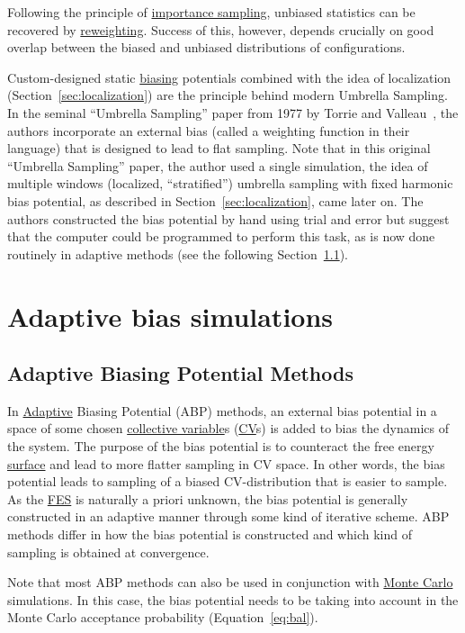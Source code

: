 \documentclass[9pt,review]{livecoms}
\begin{document}
Following the principle of \hyperlink{ref:IS} {importance sampling}, unbiased statistics can be recovered by \hyperlink{ref:Reweighting} {reweighting}.
Success of this, however, depends crucially on good overlap between the biased and unbiased distributions of configurations.

Custom-designed static \hyperlink{ref:biasingE} {biasing} potentials combined with the idea of localization (Section~\ref{sec:localization}) are the principle behind modern Umbrella Sampling.
In the seminal ``Umbrella Sampling'' paper from 1977 by Torrie and Valleau~\cite{TORRIE1977187}, the authors incorporate an external bias (called a weighting function in their language) that is designed to lead to flat sampling. Note that in this original ``Umbrella Sampling'' paper, the author used a single simulation, the idea of multiple windows (localized, ``stratified'') umbrella sampling with fixed harmonic bias potential, as described in Section~\ref{sec:localization}, came later on. The authors constructed the bias potential by hand using trial and error but suggest that the computer could be programmed to perform this task, as is now done routinely in adaptive methods (see the following Section~\ref{sec:ABP}).


\section{Adaptive bias simulations}
\label{sec:AdaptiveBiasSimulations}

\subsection{Adaptive Biasing Potential Methods}
\label{sec:ABP}
In \hyperlink{ref:Adaptive} {Adaptive} Biasing Potential (ABP) methods, an external bias potential in a space of some chosen \hyperlink{ref:CV} {collective variable}s (\hyperlink{ref:CV} {CV}s) is added to bias the dynamics of the system. The purpose of the bias potential is to counteract the free energy \hyperlink{ref:FES} {surface} and lead to more flatter sampling in CV space. In other words, the bias potential leads to sampling of a biased CV-distribution that is easier to sample. As the \hyperlink{ref:FES} {FES} is naturally a priori unknown, the bias potential is generally constructed in an adaptive manner through some kind of iterative scheme. ABP methods  differ in how the bias potential is constructed and which kind of sampling is obtained at convergence.

Note that most ABP methods can also be used in conjunction with \hyperlink{ref:MetropolisMonteCarlo} {Monte Carlo} simulations. In this case, the bias potential needs to be taking into account in the Monte Carlo acceptance probability (Equation~\ref{eq:bal}).
\end{document}
